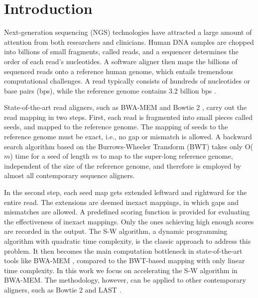 \section{Introduction} 
\label{sec:introduction}

Next-generation sequencing (NGS) technologies have attracted a large amount of attention from both researchers and clinicians. 
Human DNA samples are chopped into billions of small fragments, called reads, and a sequencer determines the order of each read's nucleotides. 
A software aligner then maps the billions of sequenced reads onto a reference human genome, which entails tremendous computational challenges.
A read typically consists of hundreds of nucleotides or base pairs (bps), while the reference genome contains 3.2 billion bps \cite{Mardis2008}.

State-of-the-art read aligners, such as BWA-MEM \cite{BWA-MEM} and Bowtie 2 \cite{Bowtie2}, 
carry out the read mapping in two steps. 
First, each read is fragmented into small pieces called seeds, and mapped to the reference genome. 
The mapping of seeds to the reference genome must be exact, i.e., no gap or mismatch is allowed. 
A backward search algorithm based on the Burrows-Wheeler Transform (BWT) \cite{BWT} takes only O($m$) time for a seed of length $m$ to map to the super-long reference genome, independent of the size of the reference genome, and therefore is employed by almost all contemporary sequence aligners.

In the second step, each seed map gets extended leftward and rightward for the entire read. 
The extensions are deemed inexact mappings, in which gaps and mismatches are allowed. A predefined scoring function is provided for evaluating the effectiveness of inexact mappings. Only the ones achieving high enough scores are recorded in the output. 
The S-W algorithm, a dynamic programming algorithm with quadratic time complexity, is the classic approach to address this problem. 
It then becomes the main computation bottleneck in state-of-the-art tools like BWA-MEM \cite{BWA-MEM}, 
compared to the BWT-based mapping with only linear time complexity. 
In this work we focus on accelerating the S-W algorithm in BWA-MEM. The methodology, however, can be applied to other contemporary aligners, such as Bowtie 2 \cite{Bowtie2} and LAST \cite{LAST}. 

